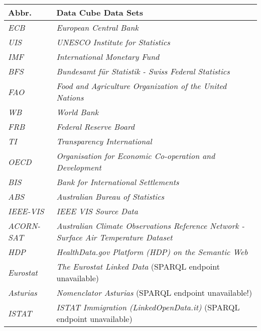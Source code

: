 \documentclass{llncs}
\begin{document}
\begin{table}[H]
	\centering
		\begin{tabular}{l|l}
      \textbf{Abbr.} & \textbf{Data Cube Data Sets} \\		
      \hline
    \emph{ECB} & \emph{European Central Bank}\tablefootnote{\url{http://www.ecb.europa.eu/home/html/index.en.html}} \\
		\emph{UIS} & \emph{UNESCO Institute for Statistics}\tablefootnote{\url{http://www.uis.unesco.org/Pages/default.aspx}} \\
		\emph{IMF} & \emph{International Monetary Fund}\tablefootnote{\url{http://www.imf.org/external/index.htm}} \\
		\emph{BFS} & \emph{Bundesamt für Statistik - Swiss Federal Statistics}\tablefootnote{\url{http://www.bfs.admin.ch/}} \\
		\emph{FAO} & \emph{Food and Agriculture Organization of the United Nations}\tablefootnote{\url{http://www.fao.org/home/en/}} \\
		\emph{WB} & \emph{World Bank}\tablefootnote{\url{http://www.worldbank.org/}} \\
		\emph{FRB} & \emph{Federal Reserve Board}\tablefootnote{\url{http://www.federalreserve.gov/}} \\
		\emph{TI} & \emph{Transparency International}\tablefootnote{\url{http://www.transparency.org/}} \\
		\emph{OECD} & \emph{Organisation for Economic Co-operation and Development}\tablefootnote{\url{http://www.oecd.org/}} \\
		\emph{BIS} & \emph{Bank for International Settlements}\tablefootnote{\url{http://www.bis.org/}} \\
		\emph{ABS} & \emph{Australian Bureau of Statistics}\tablefootnote{\url{http://abs.gov.au/}} \\
		\emph{IEEE-VIS} & \emph{IEEE VIS Source Data} \\
		\emph{ACORN-SAT} & \emph{Australian Climate Observations Reference Network - Surface Air Temperature Dataset} \\
		\emph{HDP} & \emph{HealthData.gov Platform (HDP) on the Semantic Web} \\
		\emph{Eurostat} & \emph{The Eurostat Linked Data} (SPARQL endpoint unavailable) \\
		\emph{Asturias} & \emph{Nomenclator Asturias} (SPARQL endpoint unavailable!) \\
		\emph{ISTAT} & \emph{ISTAT Immigration (LinkedOpenData.it)} (SPARQL endpoint unavailable) \\

\end{tabular}
\end{table}
\end{document}
